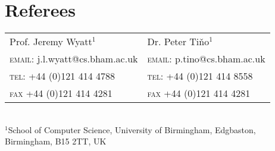 \documentclass[a4paper,10pt]{article}
\begin{document}
\section{Referees}
\begin{center}
  \begin{tabular}{l|l}
  Prof. Jeremy Wyatt$^1$ & Dr. Peter Ti{\v{n}}o$^1$\\ %
  \textsc{email}: j.l.wyatt@cs.bham.ac.uk&\textsc{email}: p.tino@cs.bham.ac.uk\\
  \textsc{tel}: +44 (0)121 414 4788&\textsc{tel}: +44 (0)121 414 8558\\
  \textsc{fax} +44 (0)121 414 4281&\textsc{fax} +44 (0)121 414 4281\\
\end{tabular}\\\vspace{0.2cm}
\footnotesize{$^1$School of Computer Science, University of Birmingham, Edgbaston, Birmingham, B15 2TT, UK}\\
\end{center}
\end{document}
